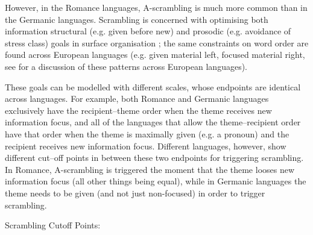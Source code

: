 However, in the Romance languages, A-scrambling is much more common than in the Germanic languages. Scrambling is concerned with optimising both information structural (e.g. given before new) and prosodic (e.g. avoidance of stress class) goals in surface organisation \citep{Hovav.2008}; the same constraints on word order are found across European languages (e.g. given material left, focused material right, see \cite{Siewierska.1998} for a discussion of these patterns across European languages). 

These goals can be modelled with different scales, whose endpoints are identical across languages. For example, both Romance and Germanic languages exclusively have the recipient--theme order when the theme receives new information focus, and all of the languages that allow the theme--recipient order have that order when the theme is maximally given (e.g. a pronoun) and the recipient receives new information focus. Different languages, however, show different cut--off points in between these two endpoints for triggering scrambling. In Romance, A-scrambling is triggered the moment that the theme looses new information focus (all other things being equal), while in Germanic languages the theme needs to be given (and not just non-focused) in order to trigger scrambling.

\begin{exe}
\ex Scrambling Cutoff Points:\\
\end{exe} 

